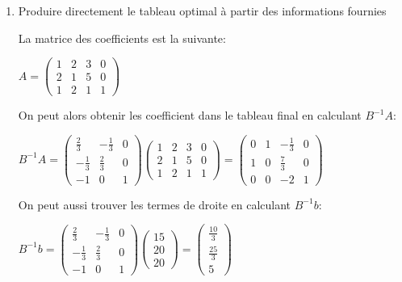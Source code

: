 \documentclass{article}
\begin{document}
\renewcommand{\theenumi}{\alph{enumi}}
\begin{enumerate}

\item Produire directement le tableau optimal à partir des informations fournies

La matrice des coefficients est la suivante:

\begin{center}
\begin{math}
A = 
\begin{pmatrix}
1 & 2 & 3 & 0\\
2 & 1 & 5 & 0\\
1 & 2 & 1 & 1
\end{pmatrix}
\end{math}
\end{center}

On peut alors obtenir les coefficient dans le tableau final en calculant $B^{-1}A$:

\begin{center}
\begin{math}
B^{-1}A =
\begin{pmatrix}
\frac{2}{3} & -\frac{1}{3} & 0\\[5pt]
-\frac{1}{3} & \frac{2}{3} & 0\\[5pt]
-1 & 0 & 1
\end{pmatrix}
\begin{pmatrix}
1 & 2 & 3 & 0\\[5pt]
2 & 1 & 5 & 0\\[5pt]
1 & 2 & 1 & 1
\end{pmatrix}
=
\begin{pmatrix}
0 & 1 & -\frac{1}{3} & 0\\[5pt]
1 & 0 &  \frac{7}{3} & 0\\[5pt]
0 & 0 &       -2     & 1
\end{pmatrix}
\end{math}
\end{center}

On peut aussi trouver les termes de droite en calculant $B^{-1}b$:

\begin{center}
\begin{math}
B^{-1}b =
\begin{pmatrix}
\frac{2}{3} & -\frac{1}{3} & 0\\[5pt]
-\frac{1}{3} & \frac{2}{3} & 0\\[5pt]
-1 & 0 & 1
\end{pmatrix}
\begin{pmatrix}
15\\[5pt]
20\\[5pt]
20
\end{pmatrix}
=
\begin{pmatrix}
\frac{10}{3}\\[5pt]
\frac{25}{3}\\[5pt]
5
\end{pmatrix}
\end{math}
\end{center}


\end{enumerate}
\end{document}
